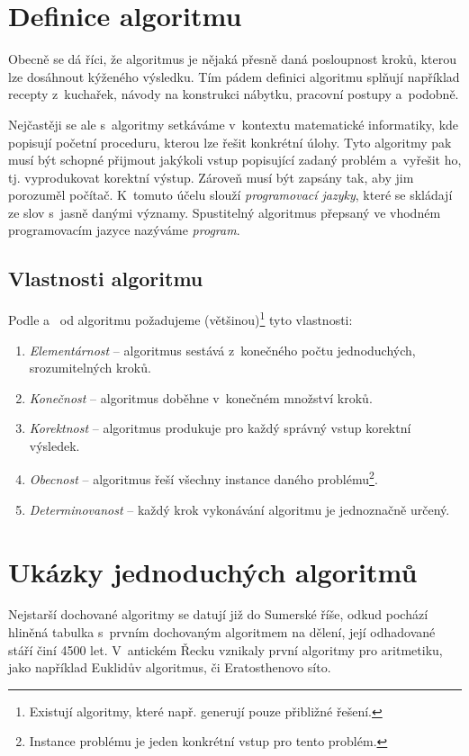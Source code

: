 \documentclass[12pt]{report}			%
\begin{document}
			\section{Definice algoritmu}
			Obecně se dá říci, že algoritmus je nějaká přesně daná posloupnost kroků, kterou lze dosáhnout kýženého výsledku. Tím pádem definici algoritmu splňují například recepty z~kuchařek, návody na konstrukci nábytku, pracovní postupy a~podobně. \cite{neckar}
			
			
			Nejčastěji se ale s~algoritmy setkáváme v~kontextu matematické informatiky, kde popisují početní proceduru, kterou lze řešit konkrétní úlohy. Tyto algoritmy pak musí být schopné přijmout jakýkoli vstup popisující zadaný problém a~vyřešit ho, tj. vyprodukovat korektní výstup. Zároveň musí být zapsány tak, aby jim porozuměl počítač. K~tomuto účelu slouží \emph{programovací jazyky}, které se skládají ze slov s~jasně danými významy. Spustitelný algoritmus přepsaný ve vhodném programovacím jazyce nazýváme \emph{program}. \cite{dvorsky} 
			\newpage
			
			\subsection{Vlastnosti algoritmu}
			Podle \cite{zaklady} a~\cite{cerny} od algoritmu požadujeme (většinou)\footnote{Existují algoritmy, které např. generují pouze přibližné řešení.} tyto vlastnosti:
			\begin{enumerate}
				\item \emph{Elementárnost} -- algoritmus sestává z~konečného počtu jednoduchých, srozumitelných kroků.
				\item \emph{Konečnost} -- algoritmus doběhne v~konečném množství kroků.
				\item \emph{Korektnost} -- algoritmus produkuje pro každý správný vstup korektní výsledek.
				\item \emph{Obecnost} -- algoritmus řeší všechny instance daného problému\footnote{Instance problému je jeden konkrétní vstup pro tento problém.}. 
				\item \emph{Determinovanost} -- každý krok vykonávání algoritmu je jednoznačně určený.
				
				
			\end{enumerate} 
			
			
			\section{Ukázky jednoduchých algoritmů}
			Nejstarší dochované algoritmy se datují již do Sumerské říše, odkud pochází hliněná tabulka s~prvním dochovaným algoritmem na dělení, její odhadované stáří činí 4500 let. V~antickém Řecku vznikaly první algoritmy pro aritmetiku, jako například Euklidův algoritmus, či Eratosthenovo síto. \cite{history}
				
\end{document}
